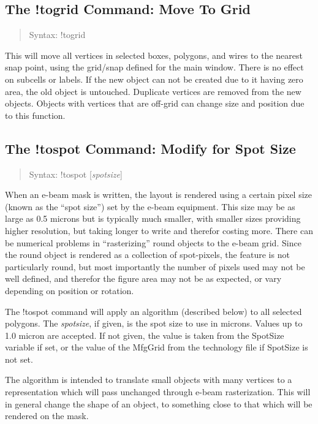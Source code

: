 \subsection{The {\cb !togrid} Command: Move To Grid}
\begin{quote}
Syntax: {\vt !togrid}
\end{quote}
This will move all vertices in selected boxes, polygons, and wires to
the nearest snap point, using the grid/snap defined for the main
window.  There is no effect on subcells or labels.  If the new object
can not be created due to it having zero area, the old object is
untouched.  Duplicate vertices are removed from the new objects. 
Objects with vertices that are off-grid can change size and position
due to this function.

\subsection{The {\cb !tospot} Command: Modify for Spot Size}
\begin{quote}
Syntax: {\vt !tospot} [{\it spotsize}]
\end{quote}
When an e-beam mask is written, the layout is rendered using a certain
pixel size (known as the ``spot size'') set by the e-beam equipment. 
This size may be as large as 0.5 microns but is typically much
smaller, with smaller sizes providing higher resolution, but taking
longer to write and therefor costing more.  There can be numerical
problems in ``rasterizing'' round objects to the e-beam grid.  Since
the round object is rendered as a collection of spot-pixels, the
feature is not particularly round, but most importantly the number of
pixels used may not be well defined, and therefor the figure area may
not be as expected, or vary depending on position or rotation.  {\Xic}

The {\cb !tospot} command will apply an algorithm (described below) to
all selected polygons.  The {\it spotsize}, if given, is the spot size
to use in microns.  Values up to 1.0 micron are accepted.  If not
given, the value is taken from the {\et SpotSize} variable if set, or
the value of the {\vt MfgGrid} from the technology file if {\et
SpotSize} is not set.

The algorithm is intended to translate small objects with many
vertices to a representation which will pass unchanged through e-beam
rasterization.  This will in general change the shape of an object, to
something close to that which will be rendered on the mask.


